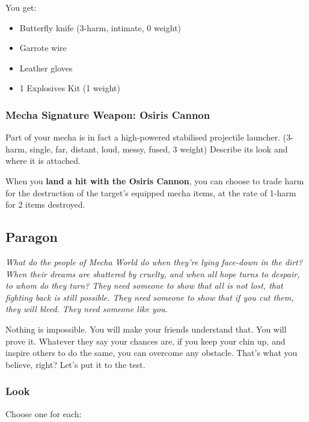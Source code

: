 You get:
\begin{itemize}
\item Butterfly knife (3-harm, intimate, 0 weight)
\item Garrote wire
\item Leather gloves
\item 1 Explosives Kit (1 weight)
\end{itemize}

\subsubsection{Mecha Signature Weapon: Osiris Cannon}
Part of your mecha is in fact a high-powered stabilised projectile launcher. (3-harm, single, far, distant, loud, messy, fused, 3 weight) Describe its look and where it is attached.

When you \textbf{land a hit with the Osiris Cannon}, you can choose to trade harm for the destruction of the target's equipped mecha items, at the rate of 1-harm for 2 items destroyed.




\subsection{Paragon}

{\itshape What do the people of Mecha World do when they're lying
  face-down in the dirt? When their dreams are shattered by cruelty,
  and when all hope turns to despair, to whom do they turn? They need
  someone to show that all is not lost, that fighting back is still
  possible. They need someone to show that if you cut them, they
  \emph{will} bleed. They need someone like you.

Nothing is impossible. You will make your friends understand that. You
will prove it. Whatever they say your chances are, if you keep your
chin up, and inspire others to do the same, you can overcome any
obstacle. That's what you believe, right? Let's put it to the test.}

\subsubsection{Look}
Choose one for each:

